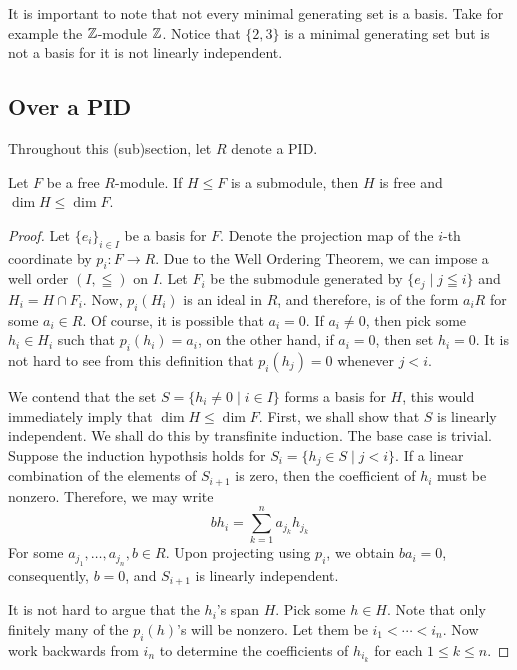 It is important to note that not every minimal generating set is a basis. Take for example the $\mathbb{Z}$-module $\mathbb{Z}$. Notice that $\{2,3\}$ is a minimal generating set but is not a basis for it is not linearly independent.

\subsection{Over a PID}

Throughout this (sub)section, let $R$ denote a PID.

\begin{theorem}
    Let $F$ be a free $R$-module. If $H\le F$ is a submodule, then $H$ is free and $\dim H\le\dim F$.
\end{theorem}
\begin{proof}
Let $\{e_i\}_{i\in I}$ be a basis for $F$. Denote the projection map of the $i$-th coordinate by $p_i: F\to R$. Due to the Well Ordering Theorem, we can impose a well order $(I,\leqq)$ on $I$. Let $F_i$ be the submodule generated by $\{e_j\mid j\leqq i\}$ and $H_i = H\cap F_i$. Now, $p_i(H_i)$ is an ideal in $R$, and therefore, is of the form $a_iR$ for some $a_i\in R$. Of course, it is possible that $a_i = 0$. If $a_i\ne 0$, then pick some $h_i\in H_i$ such that $p_i(h_i) = a_i$, on the other hand, if $a_i = 0$, then set $h_i = 0$. It is not hard to see from this definition that $p_i(h_j) = 0$ whenever $j < i$.

We contend that the set $S = \{h_i\ne 0\mid i\in I\}$ forms a basis for $H$, this would immediately imply that $\dim H\le\dim F$. First, we shall show that $S$ is linearly independent. We shall do this by transfinite induction. The base case is trivial. Suppose the induction hypothsis holds for $S_i = \{h_j\in S\mid j < i\}$. If a linear combination of the elements of $S_{i + 1}$ is zero, then the coefficient of $h_i$ must be nonzero. Therefore, we may write 
\begin{equation*}
    bh_i = \sum_{k = 1}^n a_{j_k}h_{j_k}
\end{equation*}
For some $a_{j_1},\ldots,a_{j_n},b\in R$. Upon projecting using $p_i$, we obtain $ba_i = 0$, consequently, $b = 0$, and $S_{i + 1}$ is linearly independent.

It is not hard to argue that the $h_i$'s span $H$. Pick some $h\in H$. Note that only finitely many of the $p_i(h)$'s will be nonzero. Let them be $i_1 < \cdots < i_n$. Now work backwards from $i_n$ to determine the coefficients of $h_{i_k}$ for each $1\le k\le n$.
\end{proof}

